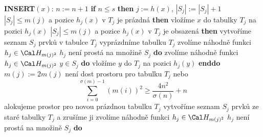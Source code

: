 \documentclass[a4paper,12pt]{article}
\begin{document}
{\bf INSERT$(x)$}: \newline 
$n:=n+1$ \newline 
{\bf if} $n\le s$ {\bf then}\newline 
\phantom{---}$j:=h(x)$, $|S_j|:=|S_j|+1$\newline 
\phantom{---}{\bf if} $|S_j|\le m(j)$ a pozice $h_j(x)$ v $T_j$ je prázdná {\bf then}\newline 
\phantom{------}vložíme $x$ do tabulky $T_j$  na pozici $
h_j(x)$\newline 
\phantom{---}{\bf else}\newline 
\phantom{------}{\bf if} $|S_j|\le m(j)$ a pozice $h_j(x)$ v $T_
j$ je obsazená {\bf then}\newline 
\phantom{---------}vytvoříme seznam $S_j$ prvků v tabulce $
T_j$\newline 
\phantom{---------}vyprázdníme tabulku $T_j$\newline 
\phantom{---------}zvolíme náhodně funkci $h_j\in \Cal H_{
m(j)^2}$\newline 
\phantom{---------}{\bf while} $h_j$ není prostá na množině $
S_j$ {\bf do}\newline 
\phantom{------------}zvolíme náhodně funkci $h_j
\in \Cal H_{m(j)^2}$\newline 
\phantom{---------}{\bf enddo}\newline 
\phantom{---------}{\bf for every} $y\in S_j$ {\bf do} vložíme $
y$ do $T_j$ na pozici $h_j(y)$ {\bf enddo}\newline 
\phantom{------}{\bf else}\newline 
\phantom{---------}$m(j):=2m(j)$\newline 
\phantom{---------}{\bf if} není dost prostoru pro tabulku $
T_j$ nebo 
$$\sum_{i=0}^{\sigma (m)-1}(m(i))^2\ge\frac {4n^2}{\sigma (n)}+n$$
\phantom{---------}{\bf then}\newline 
\phantom{------------}{\bf RehashAll}\newline 
\phantom{---------}{\bf else}\newline 
\phantom{------------}alokujeme prostor pro novou prázdnou tabulku $
T_j$ \newline 
\phantom{------------}vytvoříme seznam $S_j$ prvků ze staré tabulky $
T_j$ a zrušíme ji\newline 
\phantom{------------}zvolíme náhodně funkci $h_j\in \Cal H_{
m(j)^2}$\newline 
\phantom{------------}{\bf while} $h_j$ není prostá na množině $
S_j$ {\bf do}\newline 
\end{document}
